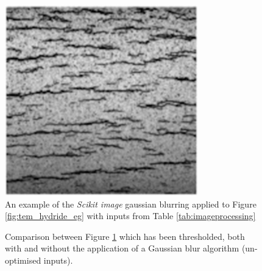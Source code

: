 \documentclass{article}
\begin{document}
	\begin{figure}[h]
	    \centering
	    \includegraphics{Figures/blurred_chu1.jpg}
	    \caption{An example of the \textit{Scikit image} gaussian blurring applied to Figure \ref{fig:tem_hydride_eg} with inputs from Table \ref{tab:imageprocessing}}
	    \label{fig:blur_chu1}
	\end{figure}
	
	\begin{figure}[h]
		\centering
		\hfill
		\caption{Comparison between Figure \ref{fig:blur_chu1} which has been thresholded, both with and without the application of a Gaussian blur algorithm (un-optimised inputs).}
		\label{fig:blur_notblur}
	\end{figure}
	
\end{document}
